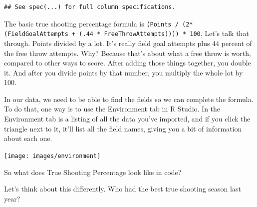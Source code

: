\documentclass[
]{book}
\newenvironment{Shaded}{\begin{snugshade}}{\end{snugshade}}
\newcommand{\DataTypeTok}[1]{\textcolor[rgb]{0.13,0.29,0.53}{#1}}
\newcommand{\DecValTok}[1]{\textcolor[rgb]{0.00,0.00,0.81}{#1}}
\newcommand{\KeywordTok}[1]{\textcolor[rgb]{0.13,0.29,0.53}{\textbf{#1}}}
\newcommand{\NormalTok}[1]{#1}
\newcommand{\OperatorTok}[1]{\textcolor[rgb]{0.81,0.36,0.00}{\textbf{#1}}}
\newcommand{\StringTok}[1]{\textcolor[rgb]{0.31,0.60,0.02}{#1}}
\begin{document}
\begin{verbatim}
## See spec(...) for full column specifications.
\end{verbatim}

The basic true shooting percentage formula is \texttt{(Points\ /\ (2*(FieldGoalAttempts\ +\ (.44\ *\ FreeThrowAttempts))))\ *\ 100}. Let's talk that through. Points divided by a lot. It's really field goal attempts plus 44 percent of the free throw attempts. Why? Because that's about what a free throw is worth, compared to other ways to score. After adding those things together, you double it. And after you divide points by that number, you multiply the whole lot by 100.

In our data, we need to be able to find the fields so we can complete the formula. To do that, one way is to use the Environment tab in R Studio. In the Environment tab is a listing of all the data you've imported, and if you click the triangle next to it, it'll list all the field names, giving you a bit of information about each one.

\texttt{[image: images/environment]}

So what does True Shooting Percentage look like in code?

Let's think about this differently. Who had the best true shooting season last year?

\begin{Shaded}
\end{Shaded}
\end{document}
